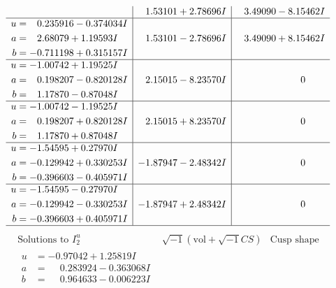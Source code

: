 \documentclass[1p]{elsarticle_modified}
\theoremstyle{definition}
\newcommand{\I}{\sqrt{-1}}
\begin{document}
$$\begin{array}{c|c|c}
 & \phantom{-}1.53101 + 2.78696 I & \phantom{-}3.49090 - 8.15462 I \\ \hline\begin{aligned}
u &= \phantom{-}0.235916 - 0.374034 I \\
a &= \phantom{-}2.68079 + 1.19593 I \\
b &= -0.711198 + 0.315157 I\end{aligned}
 & \phantom{-}1.53101 - 2.78696 I & \phantom{-}3.49090 + 8.15462 I \\ \hline\begin{aligned}
u &= -1.00742 + 1.19525 I \\
a &= \phantom{-}0.198207 - 0.820128 I \\
b &= \phantom{-}1.17870 - 0.87048 I\end{aligned}
 & \phantom{-}2.15015 - 8.23570 I & \phantom{-0.000000 } 0 \\ \hline\begin{aligned}
u &= -1.00742 - 1.19525 I \\
a &= \phantom{-}0.198207 + 0.820128 I \\
b &= \phantom{-}1.17870 + 0.87048 I\end{aligned}
 & \phantom{-}2.15015 + 8.23570 I & \phantom{-0.000000 } 0 \\ \hline\begin{aligned}
u &= -1.54595 + 0.27970 I \\
a &= -0.129942 + 0.330253 I \\
b &= -0.396603 - 0.405971 I\end{aligned}
 & -1.87947 - 2.48342 I & \phantom{-0.000000 } 0 \\ \hline\begin{aligned}
u &= -1.54595 - 0.27970 I \\
a &= -0.129942 - 0.330253 I \\
b &= -0.396603 + 0.405971 I\end{aligned}
 & -1.87947 + 2.48342 I & \phantom{-0.000000 } 0\\
 \hline 
 \end{array}$$\newpage$$\begin{array}{c|c|c}  
\text{Solutions to }I^u_{2}& \I (\text{vol} + \sqrt{-1}CS) & \text{Cusp shape}\\
 \hline 
\begin{aligned}
u &= -0.97042 + 1.25819 I \\
a &= \phantom{-}0.283924 - 0.363068 I \\
b &= \phantom{-}0.964633 - 0.006223 I\end{aligned}

\end{array}$$
\end{document}
